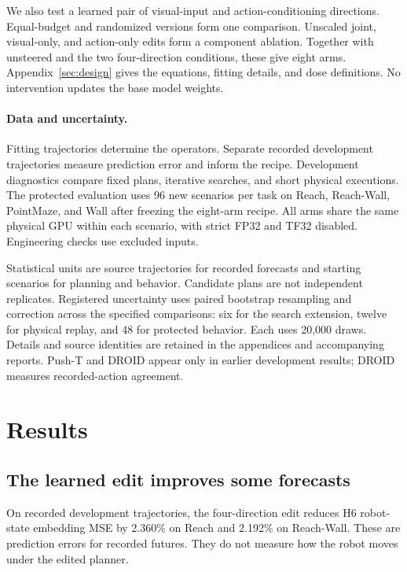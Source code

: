 \documentclass{article}
\begin{document}
We also test a learned pair of visual-input and action-conditioning directions. Equal-budget and randomized versions form one comparison. Unscaled joint, visual-only, and action-only edits form a component ablation. Together with unsteered and the two four-direction conditions, these give eight arms. Appendix~\ref{sec:design} gives the equations, fitting details, and dose definitions. No intervention updates the base model weights.

\paragraph{Data and uncertainty.}
Fitting trajectories determine the operators. Separate recorded development trajectories measure prediction error and inform the recipe. Development diagnostics compare fixed plans, iterative searches, and short physical executions. The protected evaluation uses 96 new scenarios per task on Reach, Reach-Wall, PointMaze, and Wall after freezing the eight-arm recipe. All arms share the same physical GPU within each scenario, with strict FP32 and TF32 disabled. Engineering checks use excluded inputs.

Statistical units are source trajectories for recorded forecasts and starting scenarios for planning and behavior. Candidate plans are not independent replicates. Registered uncertainty uses paired bootstrap resampling and correction across the specified comparisons: six for the search extension, twelve for physical replay, and 48 for protected behavior. Each uses 20,000 draws. Details and source identities are retained in the appendices and accompanying reports. Push-T and DROID appear only in earlier development results; DROID measures recorded-action agreement.

\section{Results}

\subsection{The learned edit improves some forecasts}

On recorded development trajectories, the four-direction edit reduces H6 robot-state embedding MSE by 2.360\% on Reach and 2.192\% on Reach-Wall. These are prediction errors for recorded futures. They do not measure how the robot moves under the edited planner.
\end{document}
